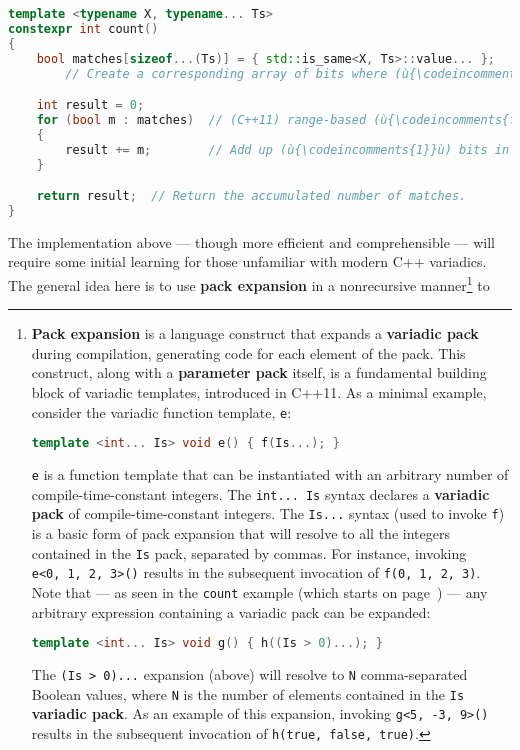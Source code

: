 \begin{lstlisting}[language=C++]
template <typename X, typename... Ts>
constexpr int count()
{
    bool matches[sizeof...(Ts)] = { std::is_same<X, Ts>::value... };
        // Create a corresponding array of bits where (ù{\codeincomments{1}}ù) indicates sameness.

    int result = 0;
    for (bool m : matches)  // (C++11) range-based (ù{\codeincomments{for}}ù) loop
    {
        result += m;        // Add up (ù{\codeincomments{1}}ù) bits in the array.
    }

    return result;  // Return the accumulated number of matches.
}
\end{lstlisting}

\noindent The implementation above --- though more efficient and comprehensible
--- will require some initial learning for those unfamiliar with modern
C++ variadics. The general idea here is to use \textbf{pack expansion}
in a nonrecursive manner{\cprotect\footnote{\textbf{Pack expansion} is
a language construct that expands a \textbf{variadic pack} during
compilation, generating code for each element of the pack. This
construct, along with a \textbf{parameter pack} itself, is a
  fundamental building block of variadic templates,
  introduced in C++11. As a minimal example, consider the variadic
  function template, \texttt{e}:

  \begin{lstlisting}[language=C++, basicstyle={\ttfamily\footnotesize}]
  template <int... Is> void e() { f(Is...); }
  \end{lstlisting}

\noindent \texttt{e} is a function template that can be instantiated
  with an arbitrary number of compile-time-constant integers. The
  \texttt{int...}~\texttt{Is} syntax declares a \textbf{variadic pack}
  of compile-time-constant integers. The \texttt{Is...} syntax (used to
  invoke \texttt{f}) is a basic form of pack expansion that will resolve
  to all the integers contained in the \texttt{Is} pack, separated by
  commas. For instance, invoking
  \texttt{e<0,}~\texttt{1,}~\texttt{2,}~\texttt{3>()} results in the
  subsequent invocation of
  \texttt{f(0,}~\texttt{1,}~\texttt{2,}~\texttt{3)}. Note that --- as
  seen in the \texttt{count} example (which starts on page~\pageref{relaxedconstexpr-countcode}) --- any arbitrary
  expression containing a variadic pack can be expanded:

  \begin{lstlisting}[language=C++, basicstyle={\ttfamily\footnotesize}]
  template <int... Is> void g() { h((Is > 0)...); }
  \end{lstlisting}

\noindent The \texttt{(Is}~\texttt{>}~\texttt{0)...} expansion (above) will
  resolve to \texttt{N} comma-separated Boolean values, where \texttt{N}
  is the number of elements contained in the \texttt{Is}
  \textbf{variadic pack}. As an example of this expansion, invoking
  \texttt{g<5,}~\texttt{-3,}~\texttt{9>()} results in the subsequent invocation of \texttt{h(true,}~\texttt{false,}~\texttt{true)}.}} to
